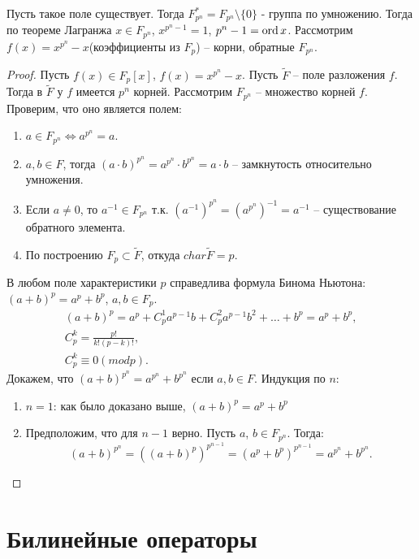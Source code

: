 \begin{idea}
    Пусть такое поле существует. Тогда $F_{p^n}^* = F_{p^n} \setminus \{0\}$ - группа по умножению. 
    Тогда по теореме Лагранжа $x \in F_{p^n}$, $x^{p^n - 1} = 1$, $p^n - 1 = \operatorname{ord} x$. Рассмотрим $f(x) = x^{p^n} - x$(коэффициенты из $F_p$) -- корни, обратные $F_{p^n}$.
\end{idea}

\begin{proof}
    Пусть $f(x) \in F_p[x]$, $f(x) = x^{p^n} - x$. Пусть $\tilde{F}$ -- поле разложения $f$. Тогда 
    в $\tilde{F}$ у $f$ имеется $p^n$ корней. Рассмотрим $F_{p^n}$ -- множество корней $f$. Проверим, 
    что оно является полем:
    \begin{enumerate}
        \item $a \in F_{p^n} \Leftrightarrow a^{p^n} = a$.
        \item $a, b \in F$, тогда $(a \cdot b)^{p^n} = a^{p^n} \cdot b^{p^n} = a \cdot b$ -- замкнутость относительно умножения.
        \item Если $a \neq 0$, то $a^{-1} \in F_{p^n}$ т.к. $(a^{-1})^{p^n} = (a^{p^n})^{-1} = a^{-1}$ -- существование обратного элемента.
        \item По построению $F_p \subset \tilde{F}$, откуда $char \tilde{F} = p$. 
    \end{enumerate}
    В любом поле характеристики $p$ справедлива формула Бинома Ньютона: $(a+b)^p = a^p + b^p$, $a, b \in F_p$. \\
    \begin{gather*}
    (a + b)^p = a^p + C_p^1 a^{p - 1} b + C_p^2 a^{p - 1} b^2 + \dots + b^p = a^p + b^p, \\
    C_p^k = \frac{p!}{k!(p - k)!}, \\ 
    C_p^k \equiv 0 (mod p).
    \end{gather*}
    Докажем, что $(a+b)^{p^n} = a^{p^n} + b^{p^n}$ если $a, b \in F$. Индукция по $n$:
    \begin{enumerate}
        \item $n=1$: как было доказано выше, $(a+b)^p = a^p + b^p$
        \item Предположим, что для $n-1$ верно. Пусть $a$, $b \in F_{p^n}$. Тогда:
        $$(a+b)^{p^n} = ((a+b)^p)^{p^{n-1}} = (a^p + b^p)^{p^{n-1}} = a^{p^n} + b^{p^n}.$$
    \end{enumerate}
\end{proof}

\section{Билинейные операторы}


